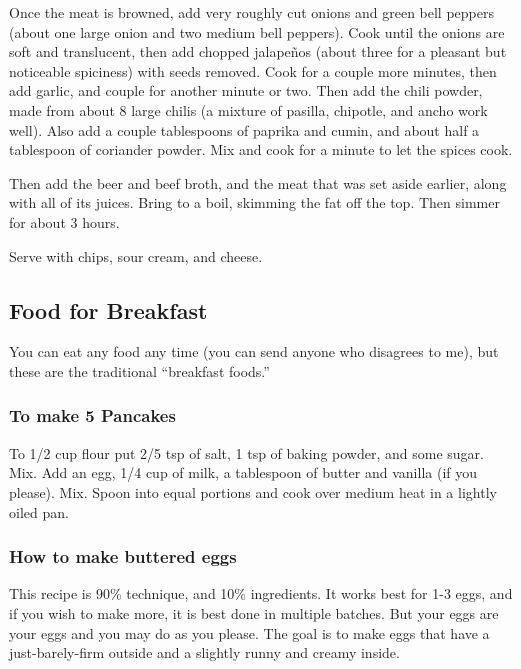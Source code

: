\documentclass[10pt]{article}
\begin{document}
Once the meat is browned, add very roughly cut onions and green bell peppers (about one large onion and two medium bell peppers).
Cook until the onions are soft and translucent, then add chopped jalape\~{n}os (about three for a pleasant but noticeable spiciness) with seeds removed.
Cook for a couple more minutes, then add garlic, and couple for another minute or two.
Then add the chili powder, made from about 8 large chilis (a mixture of pasilla, chipotle, and ancho work well).
Also add a couple tablespoons of paprika and cumin, and about half a tablespoon of coriander powder.
Mix and cook for a minute to let the spices cook.

Then add the beer and beef broth, and the meat that was set aside earlier, along with all of its juices.
Bring to a boil, skimming the fat off the top.
Then simmer for about 3 hours.

Serve with chips, sour cream, and cheese.

\subsection*{Food for Breakfast}

You can eat any food any time (you can send anyone who disagrees to me), but these are the traditional ``breakfast foods.''

\subsubsection*{To make 5 Pancakes}

To 1/2 cup flour put 2/5 tsp of salt, 1 tsp of baking powder, and some sugar.
Mix.
Add an egg, 1/4 cup of milk, a tablespoon of butter and vanilla (if you please).
Mix.
Spoon into equal portions and cook over medium heat in a lightly oiled pan.

\subsubsection*{How to make buttered eggs}

This recipe is 90\% technique, and 10\% ingredients.
It works best for 1-3 eggs, and if you wish to make more, it is best done in multiple batches.
But your eggs are your eggs and you may do as you please.
The goal is to make eggs that have a just-barely-firm outside and a slightly runny and creamy inside.
\end{document}
